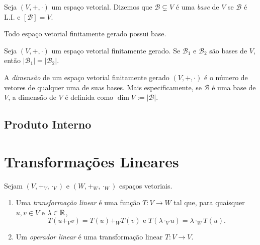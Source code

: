 \begin{definition}
    Seja $(V, +, \cdot)$ um espaço vetorial. Dizemos que $\mathcal{B} \subsetneq V$ é uma \emph{base} de $V$ se $\mathcal{B}$ é L.I. e $[\mathcal{B}] = V$.
\end{definition}

\begin{theorem}[Completamento]
     Todo espaço vetorial finitamente gerado possui base. 
\end{theorem}

\begin{theorem}[Invariância] \label{teo.alglin:invariancia}
    Seja $(V, +, \cdot)$ um espaço vetorial finitamente gerado. Se $\mathcal{B}_1$ e $\mathcal{B}_2$ são bases de $V$, então $|\mathcal{B}_1| = |\mathcal{B}_2|$.
\end{theorem}

\begin{definition}
    A \emph{dimensão} de um espaço vetorial finitamente gerado $(V, +, \cdot)$ é o número de vetores de qualquer uma de suas bases. Mais especificamente, se $\mathcal{B}$ é uma base de $V$, a dimensão de $V$ é definida como $\dim V := |\mathcal{B}|$.
\end{definition}

\section{Produto Interno}

\chapter{Transformações Lineares}

\begin{definition}
    Sejam $(V, +_V, \cdot_V)$ e $(W, +_W, \cdot_W)$ espaços vetoriais.
        \begin{enumerate}[leftmargin=*, align=left, label=\textbf{(\alph*)}]
            \item Uma \emph{transformação linear} é uma função $T : V \to W$ tal que, para quaisquer $u, v \in V$ e $\lambda \in \mathbb{R}$,
                \[
                    T(u +_V v) = T(u) +_W T(v) \text{ e } T(\lambda \cdot_V u) = \lambda \cdot_W T(u).
                \]
            \item Um \emph{operador linear} é uma transformação linear $T : V \to V$.
        \end{enumerate}
\end{definition}

